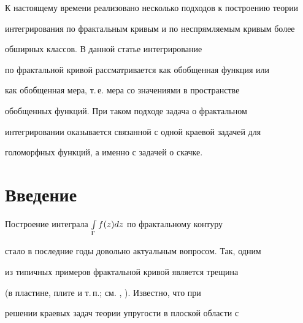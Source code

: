 

  


\pagestyle{plain} %


  


  




  


\maketitle  


\label{begin}  


 


К настоящему времени реализовано несколько подходов к построению теории 


интегрирования по фрактальным кривым и по неспрямляемым кривым более 


обширных классов. В данной статье интегрирование 


по фрактальной кривой рассматривается как обобщенная функция или 


как обобщенная мера, т.\,е. мера со значениями в пространстве 


обобщенных функций. При таком подходе задача о фрактальном 


интегрировании оказывается связанной с одной краевой задачей для 


голоморфных функций, а именно с задачей о скачке. 


 


\section{Введение} 


Построение интеграла $\int\limits_\Gamma f(z)dz$ по фрактальному контуру 


стало в последние годы довольно актуальным вопросом. Так, одним 


из типичных примеров фрактальной кривой является трещина 


(в пластине, плите и т.\,п.; см. \cite{1}, \cite{2}). Известно, что при 


решении краевых задач теории упругости в плоской области с 


